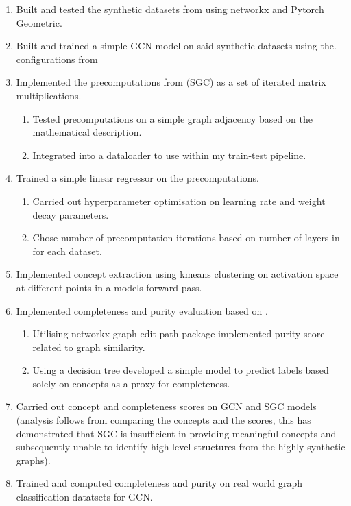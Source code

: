 \begin{enumerate}[nolistsep]
    \item Built and tested the synthetic datasets from \cite{magister2021gcexplainer} using networkx and Pytorch Geometric.
    \item Built and trained a simple GCN model on said synthetic datasets using the. configurations from \cite{magister2021gcexplainer}
    \item Implemented the precomputations from \cite{wu2019simplifying} (SGC) as a set of iterated matrix multiplications.
    \begin{enumerate}[nolistsep]
        \item Tested precomputations on a simple graph adjacency based on the mathematical description.
        \item Integrated into a dataloader to use within my train-test pipeline.
    \end{enumerate}
    \item Trained a simple linear regressor on the precomputations.
    \begin{enumerate}[nolistsep]
        \item Carried out hyperparameter optimisation on learning rate and weight decay parameters.
        \item Chose number of precomputation iterations based on number of layers in \cite{magister2021gcexplainer} for each dataset.
    \end{enumerate}
    \item Implemented concept extraction using kmeans clustering on activation space at different points in a models forward pass.
    \item Implemented completeness and purity evaluation based on \cite{magister2021gcexplainer}.
    \begin{enumerate}[nolistsep]
        \item Utilising networkx graph edit path package implemented purity score related to graph similarity.
        \item Using a decision tree developed a simple model to predict labels based solely on concepts as a proxy for completeness.
    \end{enumerate}
    \item Carried out concept and completeness scores on GCN and SGC models (analysis follows from comparing the concepts and the scores, this has demonstrated that SGC is insufficient in providing meaningful concepts and subsequently unable to identify high-level structures from the highly synthetic graphs).
    \item Trained and computed completeness and purity on real world graph classification datatsets for GCN.
\end{enumerate}

